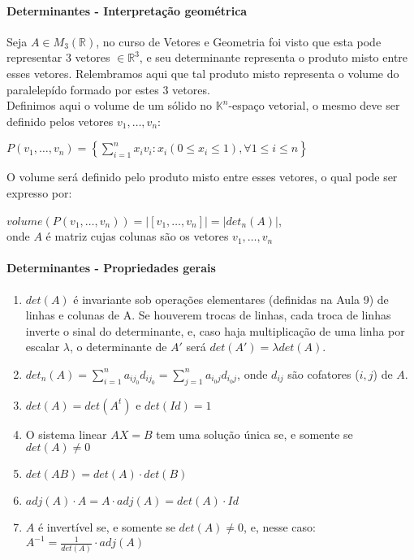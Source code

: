 \documentclass[12pt]{article}
\begin{document}
\paragraph{Determinantes - Interpretação geométrica\\}
	Seja $A \in M_3(\mathbb{R})$, no curso de Vetores e Geometria foi visto que esta pode representar 3 vetores $\in \mathbb{R}^3$, e seu determinante representa o produto misto entre esses vetores. Relembramos aqui que tal produto misto representa o volume do paralelepído formado por estes 3 vetores.\\
	Definimos aqui o volume de um sólido no $\mathbb{K}^n$-espaço vetorial, o mesmo deve ser definido pelos vetores $v_1, \dots, v_n$:
	\begin{center}
		$P(v_1, \dots, v_n) = \left\lbrace \sum\limits^n_{i=1} x_i v_i: x_i (0 \leq x_i \leq 1), \forall 1 \leq i \leq n \right\rbrace$
	\end{center}
	O volume será definido pelo produto misto entre esses vetores, o qual pode ser expresso por:
	\begin{center}
		$volume(P(v_1,\dots,v_n)) = \vert [v_1,\dots,v_n] \vert = \vert det_n(A) \vert$,\\
		onde $A$ é matriz cujas colunas são os vetores $v_1,\dots,v_n$
	\end{center}

\paragraph{Determinantes - Propriedades gerais}
	\begin{enumerate}
		\item $det(A)$ é invariante sob operações elementares (definidas na Aula 9) de linhas e colunas de A. Se houverem trocas de linhas, cada troca de linhas inverte o sinal do determinante, e, caso haja multiplicação de uma linha por escalar $\lambda$, o determinante de $A'$ será $det(A') = \lambda det(A)$.
		\item $det_n(A) = \sum\limits^n_{i=1} a_{ij_0} d_{ij_0} = \sum\limits^n_{j=1} a_{i_0j} d_{i_0j}$, onde $d_{ij}$ são cofatores ($i,j$) de $A$.
		\item $det(A) = det(A^t)$ e $det(Id) = 1$
		\item O sistema linear $AX = B$ tem uma solução única se, e somente se $det(A) \neq 0$
		\item $det(AB) =	det(A) \cdot det(B)$
		\item $adj(A) \cdot A = A \cdot adj(A) = det(A) \cdot Id$
		\item $A$ é invertível se, e somente se $det(A) \neq 0$, e, nesse caso: $A^{-1} = \frac{1}{det(A)} \cdot adj(A)$
	\end{enumerate}
\end{document}
